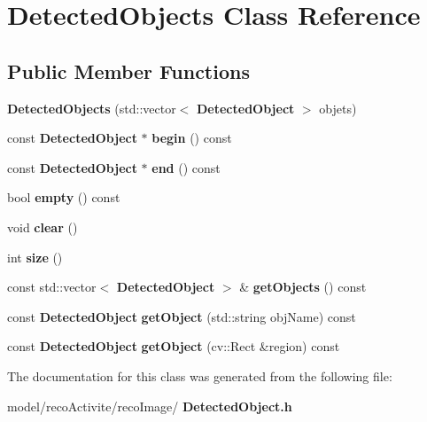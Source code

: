 \section{Detected\+Objects Class Reference}
\label{class_detected_objects}
\subsection*{Public Member Functions}
\begin{DoxyCompactItemize}
\item 
\mbox{\label{class_detected_objects_a0b0fc86edd07c4e8e75a7069eb4b376f}} 
{\bfseries Detected\+Objects} (std\+::vector$<$ \textbf{ Detected\+Object} $>$ objets)
\item 
\mbox{\label{class_detected_objects_a2675c99fc27ef17dc8547de9a58da1e7}} 
const \textbf{ Detected\+Object} $\ast$ {\bfseries begin} () const
\item 
\mbox{\label{class_detected_objects_a56c516282f25b98e22c3c35cc4dc4d53}} 
const \textbf{ Detected\+Object} $\ast$ {\bfseries end} () const
\item 
\mbox{\label{class_detected_objects_a128ebdafe5de2c20bdbe4fc306245436}} 
bool {\bfseries empty} () const
\item 
\mbox{\label{class_detected_objects_a5eb71da55a0cdd1f364748d2a97981c1}} 
void {\bfseries clear} ()
\item 
\mbox{\label{class_detected_objects_aed07916370fe8104a3c419a23cca7b34}} 
int {\bfseries size} ()
\item 
\mbox{\label{class_detected_objects_af41f73cccb545ccf93eda34f18f7f674}} 
const std\+::vector$<$ \textbf{ Detected\+Object} $>$ \& {\bfseries get\+Objects} () const
\item 
\mbox{\label{class_detected_objects_af1cd79ebf80618057ac72f4638dc5d0a}} 
const \textbf{ Detected\+Object} {\bfseries get\+Object} (std\+::string obj\+Name) const
\item 
\mbox{\label{class_detected_objects_ac476a3d452009abc2f0e3efbf21e1aac}} 
const \textbf{ Detected\+Object} {\bfseries get\+Object} (cv\+::\+Rect \&region) const
\end{DoxyCompactItemize}


The documentation for this class was generated from the following file\+:\begin{DoxyCompactItemize}
\item 
model/reco\+Activite/reco\+Image/\textbf{ Detected\+Object.\+h}\end{DoxyCompactItemize}
